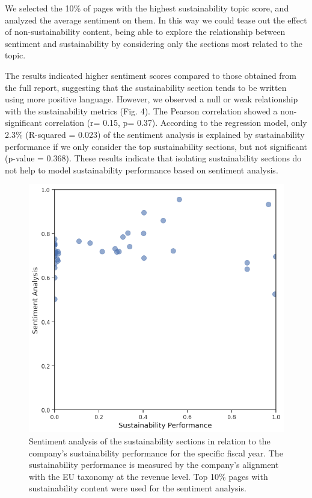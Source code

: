 \documentclass[times]{oupau}
\begin{document}
We selected the 10\% of pages with the highest sustainability topic score, and analyzed the average sentiment on them. In this way we could tease out the effect of non-sustainability content, being able to explore the relationship between sentiment and sustainability by considering only the sections most related to the topic.
\par
\justify

The results indicated higher sentiment scores compared to those obtained from the full report, suggesting that the sustainability section tends to be written using more positive language. However, we observed a null or weak relationship with the sustainability metrics (Fig. 4). The Pearson correlation showed a non-significant correlation (r= 0.15, p= 0.37). According to the regression model, only 2.3\% (R-squared = 0.023) of the sentiment analysis is explained by sustainability performance if we only consider the top sustainability sections, but not significant (p-value = 0.368). These results indicate that isolating sustainability sections do not help to model sustainability performance based on sentiment analysis.

\begin{figure}
    \centering
    \includegraphics[width=0.5\linewidth]{corr_revenue_sust.png}
    \caption{Sentiment analysis of the sustainability sections in relation to the company’s sustainability performance for the specific fiscal year. The sustainability performance is measured by the company’s alignment with the EU taxonomy at the revenue level. Top 10\% pages with sustainability content were used for the sentiment analysis.}
    \label{fig:enter-label}
\end{figure}





\end{document}

